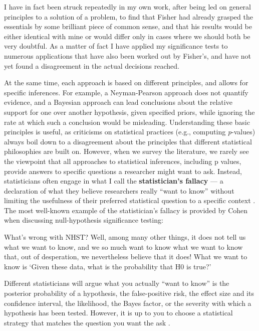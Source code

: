 \documentclass[
  oneside]{krantz}
\renewenvironment{quote}{\begin{VF}}{\end{VF}}
\begin{document}
\begin{quote}
I have in fact been struck repeatedly in my own work, after being led on general principles to a solution of a problem, to find that Fisher had already grasped the essentials by some brilliant piece of common sense, and that his results would be either identical with mine or would differ only in cases where we should both be very doubtful. As a matter of fact I have applied my significance tests to numerous applications that have also been worked out by Fisher's, and have not yet found a disagreement in the actual decisions reached.
\end{quote}

At the same time, each approach is based on different principles, and allows for specific inferences. For example, a Neyman-Pearson approach does not quantify evidence, and a Bayesian approach can lead conclusions about the relative support for one over another hypothesis, given specified priors, while ignoring the rate at which such a conclusion would be misleading. Understanding these basic principles is useful, as criticisms on statistical practices (e.g., computing \emph{p}-values) always boil down to a disagreement about the principles that different statistical philosophies are built on. However, when we survey the literature, we rarely see the viewpoint that all approaches to statistical inferences, including p values, provide answers to specific questions a researcher might want to ask. Instead, statisticians often engage in what I call the \textbf{statistician's
fallacy} --- a declaration of what they believe researchers really ``want to know'' without limiting the usefulness of their preferred statistical question to a specific context \citep{lakens_practical_2021}. The most well-known example of the statistician's fallacy is provided by Cohen \citeyearpar{cohen_earth_1994} when discussing null-hypothesis significance testing:

\begin{quote}
What's wrong with NHST? Well, among many other things, it does not tell us what we want to know, and we so much want to know what we want to know that, out of desperation, we nevertheless believe that it does! What we want to know is `Given these data, what is the probability that H0 is true?'
\end{quote}

Different statisticians will argue what you actually ``want to know'' is the posterior probability of a hypothesis, the false-positive risk, the effect size and its confidence interval, the likelihood, the Bayes factor, or the severity with which a hypothesis has been tested. However, it is up to you to choose a statistical strategy that matches the question you want the ask \citep{hand_deconstructing_1994}.
\end{document}
